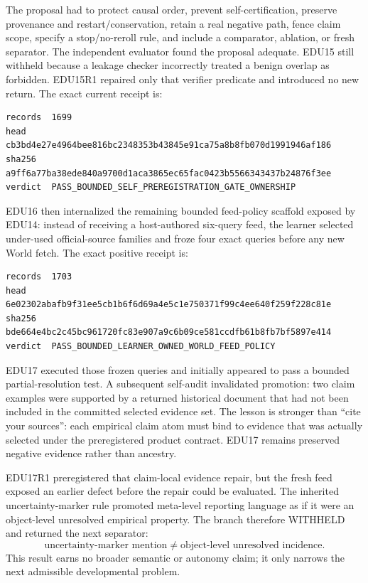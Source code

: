 \documentclass[11pt]{article}
\begin{document}
The proposal had to protect causal order, prevent self-certification, preserve
provenance and restart/conservation, retain a real negative path, fence claim
scope, specify a stop/no-reroll rule, and include a comparator, ablation, or fresh
separator.  The independent evaluator found the proposal adequate.  EDU15 still
withheld because a leakage checker incorrectly treated a benign overlap as
forbidden.  EDU15R1 repaired only that verifier predicate and introduced no new
return.  The exact current receipt is:
\begin{verbatim}
records  1699
head     cb3bd4e27e4964bee816bc2348353b43845e91ca75a8b8fb070d1991946af186
sha256   a9ff6a77ba38ede840a9700d1aca3865ec65fac0423b5566343437b24876f3ee
verdict  PASS_BOUNDED_SELF_PREREGISTRATION_GATE_OWNERSHIP
\end{verbatim}

EDU16 then internalized the remaining bounded feed-policy scaffold exposed by
EDU14: instead of receiving a host-authored six-query feed, the learner selected
under-used official-source families and froze four exact queries before any new
World fetch.  The exact positive receipt is:
\begin{verbatim}
records  1703
head     6e02302abafb9f31ee5cb1b6f6d69a4e5c1e750371f99c4ee640f259f228c81e
sha256   bde664e4bc2c45bc961720fc83e907a9c6b09ce581ccdfb61b8fb7bf5897e414
verdict  PASS_BOUNDED_LEARNER_OWNED_WORLD_FEED_POLICY
\end{verbatim}

EDU17 executed those frozen queries and initially appeared to pass a bounded
partial-resolution test.  A subsequent self-audit invalidated promotion: two
claim examples were supported by a returned historical document that had not
been included in the committed selected evidence set.  The lesson is stronger
than ``cite your sources'': each empirical claim atom must bind to evidence that
was actually selected under the preregistered product contract.  EDU17 remains
preserved negative evidence rather than ancestry.

EDU17R1 preregistered that claim-local evidence repair, but the fresh feed
exposed an earlier defect before the repair could be evaluated.  The inherited
uncertainty-marker rule promoted meta-level reporting language as if it were an
object-level unresolved empirical property.  The branch therefore WITHHELD and
returned the next separator:
\begin{equation}
\boxed{\text{uncertainty-marker mention}\neq\text{object-level unresolved incidence}.}
\end{equation}
This result earns no broader semantic or autonomy claim; it only narrows the
next admissible developmental problem.
\end{document}
